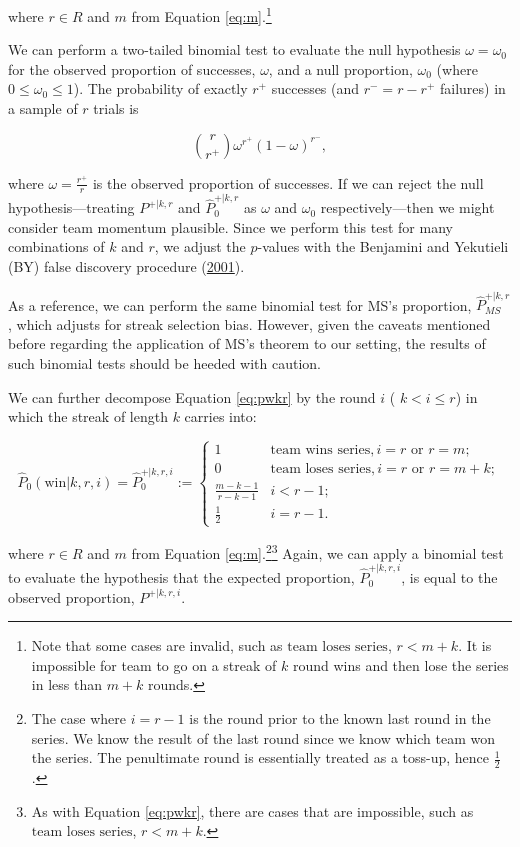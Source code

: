 \documentclass{article}
\begin{document}
where \(r \in R\) and \(m\) from Equation \ref{eq:m}.\footnote{Note that
  some cases are invalid, such as \(\text{team loses series}\),
  \(r < m + k\). It is impossible for team to go on a streak of \(k\)
  round wins and then lose the series in less than \(m + k\) rounds.}

We can perform a two-tailed binomial test to evaluate the null
hypothesis \(\omega = \omega_0\) for the observed proportion of
successes, \(\omega\), and a null proportion, \(\omega_0\) (where
\(0 \leq \omega_0 \leq 1\)). The probability of exactly \(r^+\)
successes (and \(r^- = r - r^+\) failures) in a sample of \(r\) trials
is

\begin{equation}\label{eq:binom}
\binom {r}{r^+} \omega^{r^+}(1-\omega)^{r^-},
\end{equation}

where \(\omega = \frac{r^+}{r}\) is the observed proportion of
successes. If we can reject the null hypothesis---treating \(P^{+|k,r}\)
and \(\hat{P}^{+|k,r}_0\) as \(\omega\) and \(\omega_0\)
respectively---then we might consider team momentum plausible. Since we
perform this test for many combinations of \(k\) and \(r\), we adjust
the \(p\)-values with the Benjamini and Yekutieli (BY) false discovery
procedure (\protect\hyperlink{ref-benjamini2001}{2001}).

As a reference, we can perform the same binomial test for MS's
proportion, \(\hat{P}^{+|k,r}_{MS}\), which adjusts for streak selection
bias. However, given the caveats mentioned before regarding the
application of MS's theorem to our setting, the results of such binomial
tests should be heeded with caution.

We can further decompose Equation \ref{eq:pwkr} by the round \(i\) (
\(k < i \leq r\)) in which the streak of length \(k\) carries into:

\begin{equation}\label{eq:pwkri}
\hat{P}_0(\text{win} | k, r, i) = \hat{P}^{+|k,r,i}_0 := \begin{cases}
1 & \text{team wins series}, i = r \text{ or } r = m; \\
0 & \text{team loses series}, i = r \text{ or } r = m + k; \\
\frac{m-k-1}{r-k-1} & i < r-1; \\
\frac{1}{2} & i = r-1.
\end{cases}
\end{equation}

where \(r \in R\) and \(m\) from Equation
\ref{eq:m}.\footnote{The case where \(i = r - 1\) is the round prior to
  the known last round in the series. We know the result of the last
  round since we know which team won the series. The penultimate round
  is essentially treated as a toss-up, hence \(\frac{1}{2}\).}\footnote{As
  with Equation \ref{eq:pwkr}, there are cases that are impossible, such
  as \(\text{team loses series}\), \(r < m + k\).} Again, we can apply a
binomial test to evaluate the hypothesis that the expected proportion,
\(\hat{P}^{+|k,r,i}_0\), is equal to the observed proportion,
\(P^{+|k,r,i}\).
\end{document}
